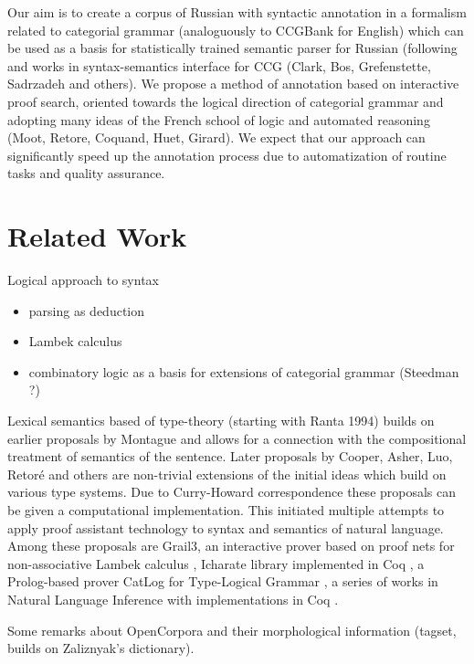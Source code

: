 \documentclass[a4paper]{article}
\theoremstyle{example-style}
\begin{document}
  Our aim is to create a corpus of Russian with syntactic annotation in a formalism related to categorial grammar (analoguously to CCGBank for English) which can be used as a basis for statistically trained semantic parser for Russian (following \parencite{clark2007wide} and works in syntax-semantics interface for CCG (Clark, Bos, Grefenstette, Sadrzadeh and others). We propose a method of annotation based on interactive proof search, oriented towards the logical direction of categorial grammar and adopting many ideas of the French school of logic and automated reasoning (Moot, Retore, Coquand, Huet, Girard). We expect that our approach can significantly speed up the annotation process due to automatization of routine tasks and quality assurance.
     

\section{Related Work}

 Logical approach to syntax
 \begin{itemize}
 	\item parsing as deduction \parencite{pereira1983parsing,kallmeyer2010parsing}
 	\item Lambek calculus \parencite{lambek1958mathematics,lambek1961calculus,konig1989parsing}
 	\item combinatory logic as a basis for extensions of categorial grammar (Steedman ?)
 \end{itemize}
 
 Lexical semantics based of type-theory (starting with Ranta 1994) builds on earlier proposals by Montague and allows for a connection with the compositional treatment of semantics of the sentence. Later proposals by Cooper, Asher, Luo, Retor\'{e} and others are non-trivial extensions of the initial ideas which build on various type systems. Due to Curry-Howard correspondence these proposals can be given a computational implementation. This initiated multiple attempts to apply proof assistant technology to syntax and semantics of natural language. Among these proposals are Grail3, an interactive prover based on proof nets for non-associative Lambek calculus \parencite{moot2002proof}, Icharate library implemented in Coq \parencite{anoun2007approche}, a Prolog-based prover CatLog for Type-Logical Grammar \parencite{morrill2012catlog}, a series of works in Natural Language Inference with implementations in Coq \parencite{chatzikyriakidis2014natural}.
 
 Some remarks about OpenCorpora and their morphological information (tagset, builds on Zaliznyak's dictionary).
\end{document}
